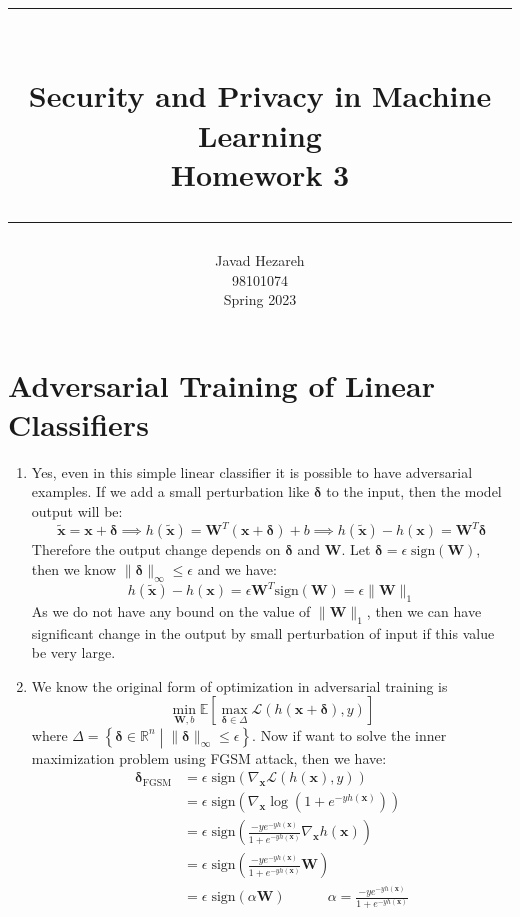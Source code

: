 \documentclass[12]{article}
\title{
	\rule{\linewidth}{2.5pt}\\
	\textbf{{\LARGE Security and Privacy in Machine Learning}}\\
	{\Large Homework 3}\\[-.35em]
	\rule{\linewidth}{0.75pt}%
}
\author{{Javad Hezareh}\\{98101074}\\[1em]Spring 2023}
\date{}
\newcommand{\myskip}{0.7em}
\newcommand{\E}{{\mathbb E}}
\begin{document}
	\maketitle
	\vspace{15mm}
	\tableofcontents
	
	\pagebreak
	\section{Adversarial Training of Linear Classifiers}
	\begin{enumerate}[label=\textbf{(\alph*)}]
		\item
		Yes, even in this simple linear classifier it is possible to have adversarial examples. If we add a small perturbation like $\bm{\delta}$ to the input, then the model output will be:
		\[
		\bm{\tilde{x}} = \bm{x} + \bm{\delta} \implies h(\bm{\tilde{x}}) = \bm{W}^T(\bm{x} + \bm{\delta}) + b \implies h(\bm{\tilde{x}}) - h(\bm{x}) = \bm{W}^T\bm{\delta}
		\]
		Therefore the output change depends on $\bm{\delta}$ and $\bm{W}$. Let $\bm{\delta} = \epsilon\;\text{sign}(\bm{W})$, then we know $\|\bm{\delta}\|_{\infty} \le \epsilon$ and we have:
		\[
		h(\bm{\tilde{x}}) - h(\bm{x}) = \epsilon\bm{W}^T \text{sign}(\bm{W}) = \epsilon\|\bm{W}\|_1
		\]
		As we do not have any bound on the value of $\|\bm{W}\|_1$, then we can have significant change in the output by small perturbation of input if this value be very large.
		\item
		We know the original form of optimization in adversarial training is
		\[
		\min_{\bm{W}, b} \E\left[\max_{\bm{\delta} \in \Delta} \mathcal{L}\left(h(\bm{x}+\bm{\delta}), y\right)\right]
		\]
		where $\Delta = \left\{\bm{\delta}\in \mathbb{R}^n  \middle| \|\bm{\delta}\|_\infty \le \epsilon\right\}$. Now if want to solve the inner maximization problem using FGSM attack, then we have:
		\[
		\begin{aligned}
			\bm{\delta}_{\text{FGSM}} &= \epsilon\;\text{sign}\left(\nabla_{\bm{x}} \mathcal{L}\left(h(\bm{x}), y\right)\right) \\[\myskip]
				&= \epsilon\;\text{sign}\left(\nabla_{\bm{x}} \log\left(1+e^{-yh(\bm{x})}\right)\right) \\[\myskip]
				&= \epsilon\;\text{sign}\left(\frac{-y e^{-yh(\bm{x})}}{1+e^{-yh(\bm{x})}}\nabla_{\bm{x}} h(\bm{x})\right) \\[\myskip]
				&= \epsilon\;\text{sign}\left(\frac{-y e^{-yh(\bm{x})}}{1+e^{-yh(\bm{x})}} \bm{W}\right) \\[\myskip]
				&= \epsilon\;\text{sign}\left(\alpha\bm{W}\right)\qquad\quad \alpha = \frac{-y e^{-yh(\bm{x})}}{1+e^{-yh(\bm{x})}}

\end{aligned}\]
\end{enumerate}
\end{document}

